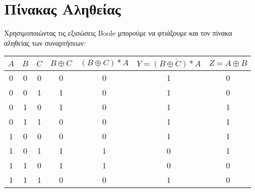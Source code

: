 \documentclass[]{article}
\begin{document}
\section{Πίνακας Αληθείας}
Χρησιμοποιώντας τις εξισώσεις Boole μπορούμε να φτιάξουμε και τον πίνακα αληθείας των συναρτήσεων:
\begin{center}
	\begin{tabular}{|c|c|c|c|c|c|c|}
		\hline \rule{0pt}{11pt} $A$ & $B$ & $C$ & $B \oplus C$ & $(B \oplus C) * A$ & $Y = \overline{(B \oplus C) * A}$ & $Z = A \oplus B$ \\
		\hline 0                    & 0   & 0   & 0            & 0                  & 1                                 & 0                \\
		0                           & 0   & 1   & 1            & 0                  & 1                                 & 0                \\
		0                           & 1   & 0   & 1            & 0                  & 1                                 & 1                \\
		0                           & 1   & 1   & 0            & 0                  & 1                                 & 1                \\
		1                           & 0   & 0   & 0            & 0                  & 1                                 & 1                \\
		1                           & 0   & 1   & 1            & 1                  & 0                                 & 1                \\
		1                           & 1   & 0   & 1            & 1                  & 0                                 & 0                \\
		1                           & 1   & 1   & 0            & 0                  & 1                                 & 0                \\
		\hline
	\end{tabular}
\end{center}
\end{document}
